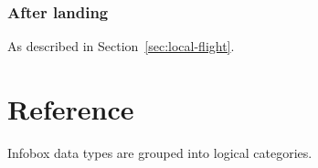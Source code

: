 \documentclass[a4paper,12pt]{refrep}
\begin{document}
\subsection*{After landing}
As described in Section~\ref{sec:local-flight}.

%
%
%
%



\chapter{{\InfoBox} Reference}\label{cha:infobox}
Infobox data types are grouped into logical categories.
\end{document}
